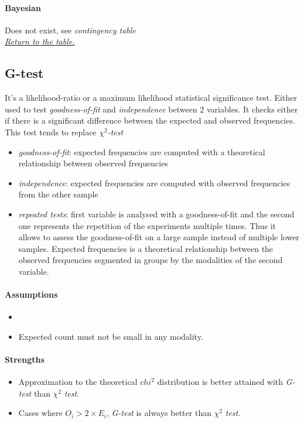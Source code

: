 \paragraph{Bayesian}
Does not exist, see \emph{contingency table} \\

\textit{\hyperref[statistical_method_table]{Return to the table.}}


\subsection{G-test}

It's a likelihood-ratio or a maximum likelihood statistical significance test. 
Either used to test \emph{goodness-of-fit} and \emph{independence} between 2 variables.
It checks either if there is a significant difference between the expected and observed 
frequencies. This test tends to replace $\chi^{2}$\emph{-test}
\begin{itemize}
    \item \emph{goodness-of-fit}: expected frequencies are computed with a theoretical 
        relationship between observed frequencies
    \item \emph{independence}: expected frequencies are computed with observed frequencies
        from the other sample
    \item \emph{repeated tests}: first variable is analysed with a goodness-of-fit and the
        second one represents the repetition of the experiments multiple times. Thus it
        allows to assess the goodness-of-fit on a large sample instead of multiple lower
        samples. Expected frequencies is a theoretical relationship between the observed
        frequencies segmented in groups by the modalities of the second variable.
\end{itemize}


\paragraph{Assumptions}
\begin{itemize}
    \item 
    \item Expected count must not be small in any modality.
\end{itemize}

\paragraph{Strengths}
\begin{itemize}
    \item Approximation to the theoretical $chi^{2}$ distribution is better attained with
        \emph{G-test} than $\chi^{2}$ \emph{test}.
    \item Cases where $O_{i} > 2\times E_{i}$, \emph{G-test} is always better than
        $\chi^{2}$ \emph{test}.
\end{itemize}

